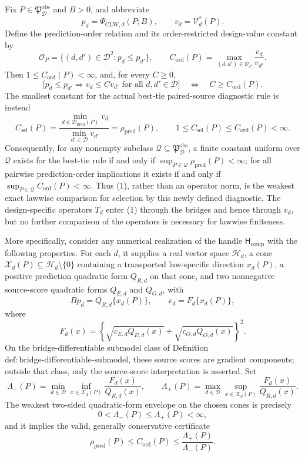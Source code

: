 Fix \(P\in\mathfrak P_{\mathcal D}^{\mathrm{obs}}\) and \(B>0\), and abbreviate
\[
 p_d=\Psi_{\mathrm{CLW},d}(P;B),
 \qquad
 v_d=\mathcal V_d^*(P).
\]
Define the prediction-order relation and its order-restricted design-value constant by
\[
 \mathcal O_P
 =\{(d,d')\in\mathcal D^2:p_d\le p_{d'}\},
 \qquad
 C_{\mathrm{ord}}(P)
 =\max_{(d,d')\in\mathcal O_P}\frac{v_d}{v_{d'}}.
 \tag{1}
\]
Then \(1\le C_{\mathrm{ord}}(P)<\infty\), and, for every \(C\ge0\),
\[
 \bigl[p_d\le p_{d'}\Longrightarrow v_d\le C v_{d'}
 \text{ for all }d,d'\in\mathcal D\bigr]
 \quad\Longleftrightarrow\quad
 C\ge C_{\mathrm{ord}}(P).
 \tag{2}
\]
The smallest constant for the actual best-tie paired-source diagnostic rule is instead
\[
 C_{\mathrm{sel}}(P)
 =\frac{\min_{d\in\mathcal D_{\mathrm{pred}}(P)}v_d}
 {\min_{d'\in\mathcal D}v_{d'}}
 =\rho_{\mathrm{pred}}(P),
 \qquad
 1\le C_{\mathrm{sel}}(P)\le C_{\mathrm{ord}}(P)<\infty.
 \tag{3}
\]
Consequently, for any nonempty subclass \(\mathcal Q\subseteq\mathfrak P_{\mathcal D}^{\mathrm{obs}}\), a finite constant uniform over \(\mathcal Q\) exists for the best-tie rule if and only if
\(\sup_{P\in\mathcal Q}\rho_{\mathrm{pred}}(P)<\infty\); for all pairwise prediction-order implications it exists if and only if
\(\sup_{P\in\mathcal Q}C_{\mathrm{ord}}(P)<\infty\).  Thus (1), rather than an operator norm, is the weakest exact lawwise comparison for selection by this newly defined diagnostic.  The design-specific operators \(T_d\) enter (1) through the bridges and hence through \(v_d\), but no further comparison of the operators is necessary for lawwise finiteness.

More specifically, consider any numerical realization of the handle \(\mathsf H_{\mathrm{comp}}\) with the following properties.  For each \(d\), it supplies a real vector space \(\mathcal H_d\), a cone \(\mathcal X_d(P)\subseteq\mathcal H_d\setminus\{0\}\) containing a transported law-specific direction \(x_d(P)\), a positive prediction quadratic form \(Q_{R,d}\) on that cone, and two nonnegative source-score quadratic forms \(Q_{E,d}\) and \(Q_{O,d}\), with
\[
 Bp_d=Q_{R,d}\{x_d(P)\},
 \qquad
 v_d=F_d\{x_d(P)\},
 \tag{4}
\]
where
\[
 F_d(x)
 =\left\{
 \sqrt{c_{E,d}Q_{E,d}(x)}
 +\sqrt{c_{O,d}Q_{O,d}(x)}
 \right\}^2.
 \tag{5}
\]
On the bridge-differentiable submodel class of Definition~\(\mathrm{def{:}bridge\text{-}differentiable\text{-}submodel}\), these source scores are gradient components; outside that class, only the source-score interpretation is asserted.  Set
\[
 \Lambda_-(P)
 =\min_{d\in\mathcal D}\inf_{x\in\mathcal X_d(P)}
 \frac{F_d(x)}{Q_{R,d}(x)},
 \qquad
 \Lambda_+(P)
 =\max_{d\in\mathcal D}\sup_{x\in\mathcal X_d(P)}
 \frac{F_d(x)}{Q_{R,d}(x)}.
 \tag{6}
\]
The weakest two-sided quadratic-form envelope on the chosen cones is precisely
\[
 0<\Lambda_-(P)\le\Lambda_+(P)<\infty,
 \tag{7}
\]
and it implies the valid, generally conservative certificate
\[
 \rho_{\mathrm{pred}}(P)
 \le C_{\mathrm{ord}}(P)
 \le\frac{\Lambda_+(P)}{\Lambda_-(P)}.
 \tag{8}
\]

